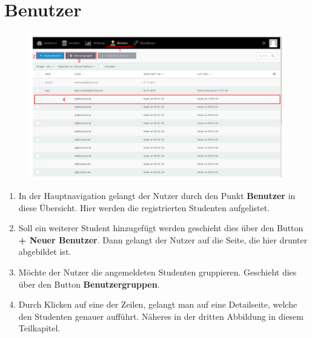   \section{Benutzer}
  \label{section:users}
  \begin{figure}
  	\centering
  	\includegraphics[scale=0.5]{backend/img/users_1.pdf}
  \end{figure}
  \begin{enumerate}
   \item In der Hauptnavigation gelangt der Nutzer durch den Punkt \textbf{Benutzer} in diese Übersicht.
	 Hier werden die registrierten Studenten aufgelistet.
   \item Soll ein weiterer Student hinzugefügt werden geschieht dies über den Button \textbf{+ Neuer Benutzer}.
	 Dann gelangt der Nutzer auf die Seite, die hier drunter abgebildet ist.
   \item Möchte der Nutzer die angemeldeten Studenten gruppieren. Geschieht dies über den Button \textbf{Benutzergruppen}.
   \item Durch Klicken auf eine der Zeilen, gelangt man auf eine Detailseite, welche den Studenten genauer aufführt.
	 Näheres in der dritten Abbildung in diesem Teilkapitel.
  \end{enumerate}

